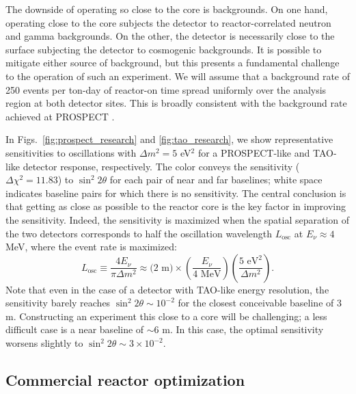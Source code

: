 \documentclass[prd, twocolumn, tightenlines, twoside, secnumarabic, superscriptaddress, preprintnumbers, nofootinbib, notitlepage]{revtex4-1}
\begin{document}
The downside of operating so close to the core is backgrounds. On one hand, operating close to the core subjects the detector to reactor-correlated neutron and gamma backgrounds. On the other, the detector is necessarily close to the surface  subjecting the detector to cosmogenic backgrounds. It is possible to mitigate either source of background, but this presents a fundamental challenge to the operation of such an experiment. We will assume that a background rate of 250 events per ton-day of reactor-on time spread uniformly over the analysis region at both detector sites. This is broadly consistent with the background rate achieved at PROSPECT \cite{Andriamirado:2020erz}.

In Figs.~\ref{fig:prospect_research} and \ref{fig:tao_research}, we show representative sensitivities to oscillations with $\Delta m^2 = 5$ eV$^2$ for a PROSPECT-like and TAO-like detector response, respectively. The color conveys the sensitivity ($\Delta \chi^2 = 11.83$) to $\sin^2 2\theta$ for each pair of near and far baselines; white space indicates baseline pairs for which there is no sensitivity. The central conclusion is that getting as close as possible to the reactor core is the key factor in improving the sensitivity. Indeed, the sensitivity is maximized when the spatial separation of the two detectors corresponds to half the oscillation wavelength $L_\text{osc}$ at $E_\nu \approx 4$ MeV, where the event rate is maximized:
\begin{equation}
    \label{eq:osc_wavelength}
    L_\text{osc} \equiv \frac{4 E_\nu}{\pi \Delta m^2} \approx \text{(2 m)} \times \left( \frac{E_\nu}{\text{4 MeV}} \right) \left( \frac{\text{5 eV}^2}{\Delta m^2} \right).
\end{equation}
Note that even in the case of a detector with TAO-like energy resolution, the sensitivity barely reaches $\sin^2 2\theta \sim 10^{-2}$ for the closest conceivable baseline of 3 m. Constructing an experiment this close to a core will be challenging; a less difficult case is a near baseline of $\sim 6$ m. In this case, the optimal sensitivity worsens slightly to $\sin^2 2\theta \sim 3 \times 10^{-2}$.

\subsection{Commercial reactor optimization}
\label{sec:cr}
\end{document}
